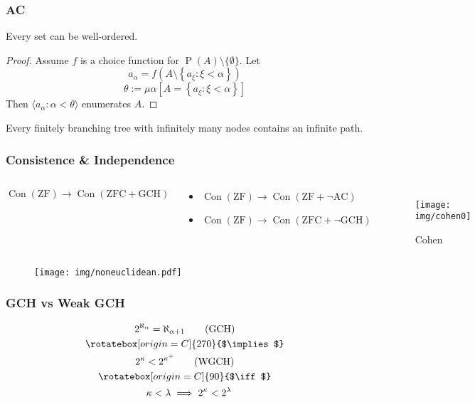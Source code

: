 \documentclass[UTF8,aspectratio=43,11pt,colorlinks,compress,openany]{beamer}%
\begin{document}
\begin{frame}\frametitle{AC}
	\begin{theorem}
		Every set can be well-ordered.
	\end{theorem}
	\begin{proof}
		Assume $f$ is a choice function for $\operatorname{P}(A)\setminus\{\emptyset\}$. Let
		\[a_\alpha=f\left(A\setminus\left\{a_\xi: \xi<\alpha\right\}\right)\]
		\[\theta:=\mu\alpha\left[A=\left\{a_\xi: \xi<\alpha\right\}\right]\]
		Then $\langle a_\alpha: \alpha<\theta\rangle$ enumerates $A$.
	\end{proof}
	\begin{lemma}
		Every finitely branching tree with infinitely many nodes contains an infinite path.
	\end{lemma}
\end{frame}

\begin{frame}\frametitle{Consistence \& Independence}
	\begin{columns}
			\begin{theorem}[G\"odel1938]
				\[\operatorname{Con}(\mathrm{ZF})\to\operatorname{Con}(\mathrm{ZFC+GCH})\]
			\end{theorem}
			\begin{theorem}[Cohen1963]
				\begin{itemize}
					\item $\operatorname{Con}(\mathrm{ZF})\to\operatorname{Con}(\mathrm{ZF}+\neg\mathrm{AC})$
					\item $\operatorname{Con}(\mathrm{ZF})\to\operatorname{Con}(\mathrm{ZFC}+\neg\mathrm{GCH})$
				\end{itemize}
			\end{theorem}
			\begin{figure}
				\texttt{[image: img/cohen0]}\caption{Cohen}
			\end{figure}
	\end{columns}
			\begin{figure}
				\texttt{[image: img/noneuclidean.pdf]}
			\end{figure}
\end{frame}

\begin{frame}\frametitle{GCH vs Weak GCH}
\begin{gather*}
2^{\aleph_\alpha}=\aleph_{\alpha+1}\tag{GCH}\\
\rotatebox[origin=C]{270}{$\implies$}\\
2^\kappa<2^{\kappa^+}\tag{WGCH}\\
\rotatebox[origin=C]{90}{$\iff$}\\
\;\;\;\kappa<\lambda\implies 2^\kappa<2^\lambda
\end{gather*}
\centering{}
\end{frame}
\end{document}
